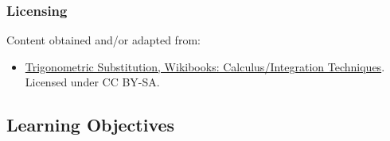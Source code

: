 \subsubsection{Licensing}
\label{sss:lice-7352}

Content obtained and/or adapted from:

\begin{itemize}

\item \href{https://en.wikibooks.org/wiki/Calculus/Integration_techniques/Trigonometric_Substitution}{Trigonometric Substitution, Wikibooks: Calculus/Integration Techniques}.  
Licensed under CC BY-SA.

\end{itemize}

\subsection{Learning Objectives}


